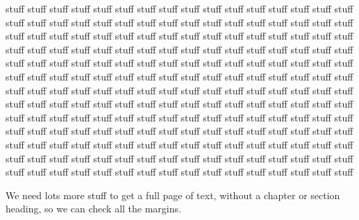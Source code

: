 \documentclass[dissertation]{bsu-cs}  %
\begin{document}
stuff stuff stuff stuff stuff stuff stuff stuff stuff stuff stuff stuff stuff
stuff stuff stuff stuff stuff stuff stuff stuff stuff stuff stuff stuff stuff
stuff stuff stuff stuff stuff stuff stuff stuff stuff stuff stuff stuff stuff
stuff stuff stuff stuff stuff stuff stuff stuff stuff stuff stuff stuff stuff
stuff stuff stuff stuff stuff stuff stuff stuff stuff stuff stuff stuff stuff
stuff stuff stuff stuff stuff stuff stuff stuff stuff stuff stuff stuff stuff
stuff stuff stuff stuff stuff stuff stuff stuff stuff stuff stuff stuff stuff
stuff stuff stuff stuff stuff stuff stuff stuff stuff stuff stuff stuff stuff
stuff stuff stuff stuff stuff stuff stuff stuff stuff stuff stuff stuff stuff
stuff stuff stuff stuff stuff stuff stuff stuff stuff stuff stuff stuff stuff
stuff stuff stuff stuff stuff stuff stuff stuff stuff stuff stuff stuff stuff
stuff stuff stuff stuff stuff stuff stuff stuff stuff stuff stuff stuff stuff
stuff stuff stuff stuff stuff stuff stuff stuff stuff stuff stuff stuff stuff
stuff stuff stuff stuff stuff stuff stuff stuff stuff stuff stuff stuff stuff
stuff stuff stuff stuff stuff stuff stuff stuff stuff stuff stuff stuff stuff
stuff stuff stuff stuff stuff stuff stuff stuff stuff stuff stuff stuff stuff

We need lots more stuff to get a full page of text, without a chapter or section heading,
so we can check all the margins.
\end{document}
